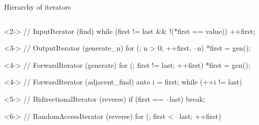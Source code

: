 \begin{frame}[fragile]{Hierarchy of iterators}

  \begin{columns}[T]
    \begin{column}{.55\textwidth}
      \begin{codeblock}<2->{\tiny
// InputIterator (find)
while (first \alert{!=} last \&\& !(\alert{*}first == value)) \alert{++}first;}\end{codeblock}

      \begin{codeblock}<3->{\tiny
// OutputIterator (generate_n)
for (; n > 0; \alert{++}first, --n) \alert{*}first \alert{=} gen();}\end{codeblock}

      \begin{codeblock}<4->{\tiny
// ForwardIterator (generate)
for (; first \alert{!=} last; \alert{++}first) \alert{*}first \alert{=} gen();}\end{codeblock}

      \begin{codeblock}<4->{\tiny
// ForwardIterator (adjacent_find)
auto i = \alert{first};
while (\alert{++i} != last) \ddd}\end{codeblock}

      \begin{codeblock}<5->{\tiny
// BidirectionalIterator (reverse)
if (first == \alert{--}last) break;}\end{codeblock}

      \begin{codeblock}<6->{\tiny
// RandomAccessIterator (reverse)
for (; first \alert{<} --last; ++first) \ddd}\end{codeblock}
    \end{column}


\end{columns}
\end{frame}

